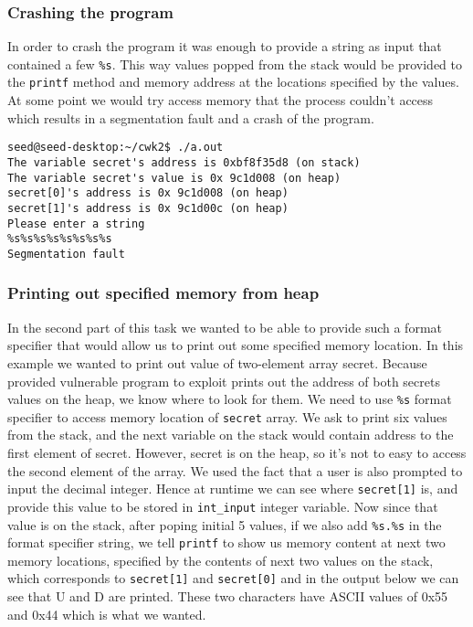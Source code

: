 \documentclass[12pt, a4paper, pdflatex]{article}
\begin{document}
\subsubsection{Crashing the program}
In order to crash the program it was enough to provide a string as input that contained a few \texttt{\%s}. This way values popped from the stack would be provided to the \texttt{printf} method and memory address at the locations specified by the values. At some point we would try access memory that the process couldn't access which results in a segmentation fault and a crash of the program.

\vspace{1em}
\lstset{
	captionpos=b,
	frame=single,
	language=BASH,
  breaklines=true,
	caption=Example of crashing the program,
	label=printf:crash
}
\begin{lstlisting}
seed@seed-desktop:~/cwk2$ ./a.out 
The variable secret's address is 0xbf8f35d8 (on stack)
The variable secret's value is 0x 9c1d008 (on heap)
secret[0]'s address is 0x 9c1d008 (on heap)
secret[1]'s address is 0x 9c1d00c (on heap)
Please enter a string
%s%s%s%s%s%s%s%s
Segmentation fault
\end{lstlisting}

\subsubsection{Printing out specified memory from heap}
In the second part of this task we wanted to be able to provide such a format specifier that would allow us to print out some specified memory location. In this example we wanted to print out value of two-element array secret. Because provided vulnerable program to exploit prints out the address of both secrets values on the heap, we know where to look for them. We need to use \texttt{\%s} format specifier to access memory location of 
\texttt{secret} array. We ask to print six values from the stack, and the next variable on the stack would contain address to the first element of secret. However, secret is on the heap, so it's not to easy to access the second element of the array. We used the fact that a user is also prompted to input the decimal integer. Hence at runtime we can see where \texttt{secret[1]} is, and provide this value to be stored in \texttt{int\_input} integer variable. Now since that value is on the stack, after poping initial 5 values, if we also add \texttt{\%s.\%s} in the format specifier string, we tell \texttt{printf} to show us memory content at next two memory locations, specified by the contents of next two values on the stack, which corresponds to \texttt{secret[1]} and \texttt{secret[0]} and in the output below we can see that U and D are printed. These two characters have ASCII values of 0x55 and 0x44 which is what we wanted.
\end{document}
